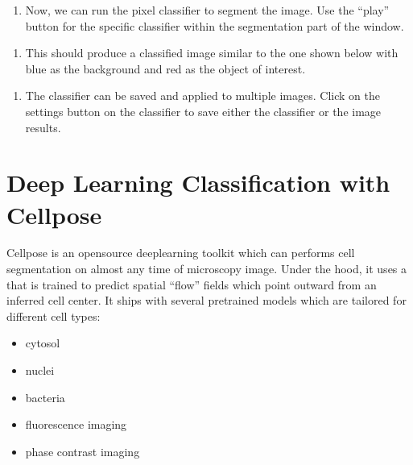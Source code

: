 \documentclass[letterpaper,10pt,english]{jupyterBook}
\begin{document}
\sphinxAtStartPar
{}
\begin{enumerate}
%
\setcounter{enumi}{2}
\item {} 
\sphinxAtStartPar
Now, we can run the pixel classifier to segment the image. Use the “play” button for the specific classifier within the segmentation part of the window.

\end{enumerate}

\sphinxAtStartPar
{}
\begin{enumerate}
%
\setcounter{enumi}{3}
\item {} 
\sphinxAtStartPar
This should produce a classified image similar to the one shown below with blue as the background and red as the object of interest.

\end{enumerate}

\sphinxAtStartPar
{}
\begin{enumerate}
%
\setcounter{enumi}{4}
\item {} 
\sphinxAtStartPar
The classifier can be saved and applied to multiple images. Click on the settings button on the classifier to save either the classifier or the image results.

\end{enumerate}

\sphinxAtStartPar
{}

\sphinxstepscope


\chapter{Deep Learning Classification with Cellpose}
\label{\detokenize{cellpose:deep-learning-classification-with-cellpose}}\label{\detokenize{cellpose::doc}}
\sphinxAtStartPar
Cellpose is an open\sphinxhyphen{}source deep\sphinxhyphen{}learning toolkit which can performs cell segmentation on almost any time of microscopy image. Under the hood, it uses a  that is trained to predict spatial “flow” fields which point outward from an inferred cell center. It ships with several pre\sphinxhyphen{}trained models which are tailored for different cell types:
\begin{itemize}
\item {} 
\sphinxAtStartPar
cytosol

\item {} 
\sphinxAtStartPar
nuclei

\item {} 
\sphinxAtStartPar
bacteria

\item {} 
\sphinxAtStartPar
fluorescence imaging

\item {} 
\sphinxAtStartPar
phase contrast imaging

\end{itemize}
\end{document}
